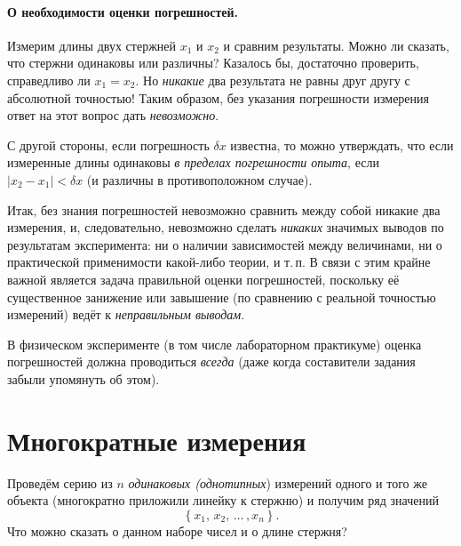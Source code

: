 
\paragraph{О необходимости оценки погрешностей.}

Измерим длины двух стержней $x_{1}$ и $x_{2}$ и сравним результаты.
Можно ли сказать, что стержни одинаковы или различны? Казалось бы,
достаточно проверить, справедливо ли $x_{1}=x_{2}$. Но \emph{никакие}
два результата не равны друг другу с абсолютной точностью! Таким образом,
без указания погрешности измерения ответ на этот вопрос дать \emph{невозможно}. 

С другой стороны, если погрешность $\delta x$ известна, то можно
утверждать, что если измеренные длины одинаковы \emph{в пределах погрешности
опыта}, если $|x_{2}-x_{1}|<\delta x$ (и различны в противоположном
случае).

Итак, без знания погрешностей невозможно сравнить между собой никакие
два измерения, и, следовательно, невозможно сделать \emph{никаких}
значимых выводов по результатам эксперимента: ни о наличии зависимостей
между величинами, ни о практической применимости какой-либо теории,
и т.\,п. В связи с этим крайне важной является задача правильной
оценки погрешностей, поскольку её существенное занижение или завышение
(по сравнению с реальной точностью измерений) ведёт к \emph{неправильным
выводам}.

В физическом эксперименте (в том числе лабораторном практикуме) оценка погрешностей должна проводиться \emph{всегда}
(даже когда составители задания забыли упомянуть об этом).

\section{Многократные измерения}

Проведём серию из $n$ \emph{одинаковых (однотипных}) измерений одного
и того же объекта (многократно приложили линейку к стержню) и получим
ряд значений
\[
\left\{ x_{1},\,x_{2},\,\ldots\,,x_{n}\right\} .
\]
Что можно сказать о данном наборе чисел и о длине стержня?

